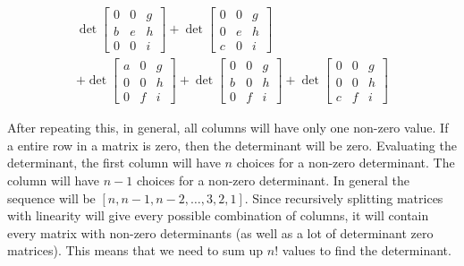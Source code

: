 \documentclass{article}
\theoremstyle{mytheoremstyle}
\theoremstyle{mytheoremstyle}
\theoremstyle{myproblemstyle}
\begin{document}
\begin{align*}
        \det \begin{bmatrix}
            0 & 0 & g \\
            b & e & h \\
            0 & 0 & i
        \end{bmatrix} +
        \det \begin{bmatrix}
            0 & 0 & g \\
            0 & e & h \\
            c & 0 & i
        \end{bmatrix} \\ +
        \det \begin{bmatrix}
            a & 0 & g \\
            0 & 0 & h \\
            0 & f & i
        \end{bmatrix} + 
        \det \begin{bmatrix}
            0 & 0 & g \\
            b & 0 & h \\
            0 & f & i
        \end{bmatrix} +
        \det \begin{bmatrix}
            0 & 0 & g \\
            0 & 0 & h \\
            c & f & i
        \end{bmatrix}
    \end{align*}

    After repeating this, in general, all columns will have only one non-zero
    value. If a entire row in a matrix is zero, then the determinant will be
    zero. Evaluating the determinant, the first column will have $n$ choices for
    a non-zero determinant. The column will have $n-1$ choices for a non-zero
    determinant. In general the sequence will be $[n, n-1, n-2,\dots, 3, 2, 1]$.
    Since recursively splitting matrices with linearity will give every possible
    combination of columns, it will contain every matrix with non-zero
    determinants (as well as a lot of determinant zero matrices). This means
    that we need to sum up $n!$ values to find the determinant.
\end{document}
